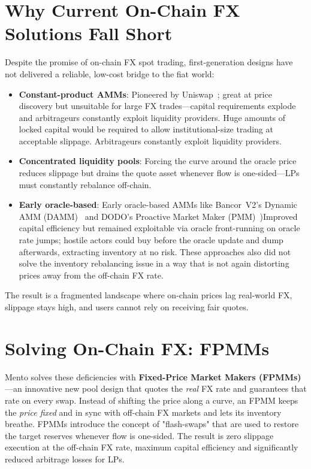 \documentclass[a4paper]{article}
\providecommand{\hyp}{-}
\theoremstyle{definition}
\begin{document}
\section{Why Current On\hyp Chain FX Solutions Fall Short}
\label{sec:fx_shortfalls}
Despite the promise of on\hyp chain FX spot trading, first\hyp generation designs have not delivered a reliable, low\hyp cost bridge to the fiat world:
\begin{itemize}[leftmargin=*]
  \item \textbf{Constant\hyp product AMMs}: Pioneered by Uniswap~\cite{uniswap_whitepaper}; great at price discovery but unsuitable for large FX trades—capital requirements explode and arbitrageurs constantly exploit liquidity providers. Huge amounts of locked capital would be required to allow institutional-size trading at acceptable slippage. Arbitrageurs constantly exploit liquidity providers. 
  \item \textbf{Concentrated liquidity pools}: Forcing the curve around the oracle price reduces slippage but drains the quote asset whenever flow is one\hyp sided––LPs must constantly rebalance off\hyp chain.
  \item \textbf{Early oracle\hyp based}: Early oracle-based AMMs like Bancor~V2's Dynamic AMM (DAMM)~\cite{bancor_v2} and DODO's Proactive Market Maker (PMM)~\cite{dodo_pmm})Improved capital efficiency but remained exploitable via oracle front\hyp running on oracle rate jumps; hostile actors could buy before the oracle update and dump afterwards, extracting inventory at no risk. These approaches also did not solve the inventory rebalancing issue in a way that is not again distorting prices away from the off-chain FX rate.
\end{itemize}

The result is a fragmented landscape where on\hyp chain prices lag real\hyp world FX, slippage stays high, and users cannot rely on receiving fair quotes.

\section{Solving On-Chain FX: FPMMs}
\label{sec:fpmm_overview}


Mento solves these deficiencies with \textbf{Fixed\hyp Price Market Makers (FPMMs)}—an innovative new pool design that quotes the \emph{real} FX rate and guarantees that rate on every swap. Instead of shifting the price along a curve, an FPMM keeps the \emph{price fixed} and in sync with off-chain FX markets and lets its inventory breathe. FPMMs introduce the concept of "flash-swaps" that are used to restore the target reserves whenever flow is one\hyp sided. The result is zero slippage execution at the off-chain FX rate, maximum capital efficiency and significantly reduced arbitrage losses for LPs.
\end{document}
